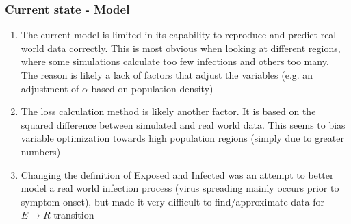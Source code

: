 \documentclass{beamer}
\begin{document}
\begin{frame}
	\frametitle{Current state - Model}
	\label{sec:StateModel}
	\begin{enumerate}[$\bullet$]
		\item The current model is limited in its capability to reproduce and predict real world data correctly. This is most obvious when looking at
			different regions, where some simulations calculate too few infections and others too many.\\
			The reason is likely a lack of factors that adjust the variables (e.g. an adjustment of $\alpha$ based on population density)
		\item The loss calculation method is likely another factor. It is based on the squared difference between simulated
			and real world data. This seems to bias variable optimization towards high population regions (simply due to greater numbers)
		\item Changing the definition of Exposed and Infected was an attempt to better model a real world infection process (virus spreading mainly
			occurs prior to symptom onset), but made it very difficult to find/approximate data for $E\rightarrow R$ transition
	\end{enumerate}
\end{frame}


%

%

\end{document}

